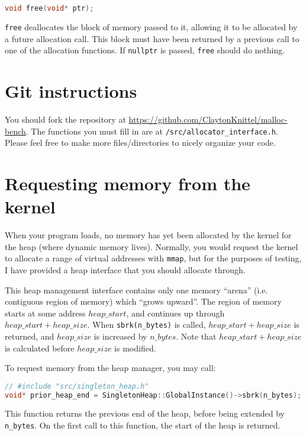 \documentclass{article}
\begin{document}
\begin{lstlisting}[language=C++]
void free(void* ptr);
\end{lstlisting}

\texttt{free} deallocates the block of memory passed to it, allowing it to be allocated by a future allocation call. This block must have been returned by a previous call to one of the allocation functions. If \texttt{nullptr} is passed, \texttt{free} should do nothing.

\section*{Git instructions}

You should fork the repository at \url{https://github.com/ClaytonKnittel/malloc-bench}. The functions you must fill in are at \texttt{/src/allocator\_interface.h}. Please feel free to make more files/directories to nicely organize your code.

\section*{Requesting memory from the kernel}

When your program loads, no memory has yet been allocated by the kernel for the heap (where dynamic memory lives). Normally, you would request the kernel to allocate a range of virtual addresses with \texttt{mmap}, but for the purposes of testing, I have provided a heap interface that you should allocate through.

This heap management interface contains only one memory ``arena'' (i.e. contiguous region of memory) which ``grows upward''. The region of memory starts at some address $heap\_start$, and continues up through $heap\_start+heap\_size$. When \texttt{sbrk(n\_bytes)} is called, $heap\_start+heap\_size$ is returned, and $heap\_size$ is increased by $n\_bytes$. Note that $heap\_start+heap\_size$ is calculated before $heap\_size$ is modified.

To request memory from the heap manager, you may call:

\begin{lstlisting}[language=C++]
// #include "src/singleton_heap.h"
void* prior_heap_end = SingletonHeap::GlobalInstance()->sbrk(n_bytes);
\end{lstlisting}

This function returns the previous end of the heap, before being extended by \texttt{n\_bytes}. On the first call to this function, the start of the heap is returned.
\end{document}
